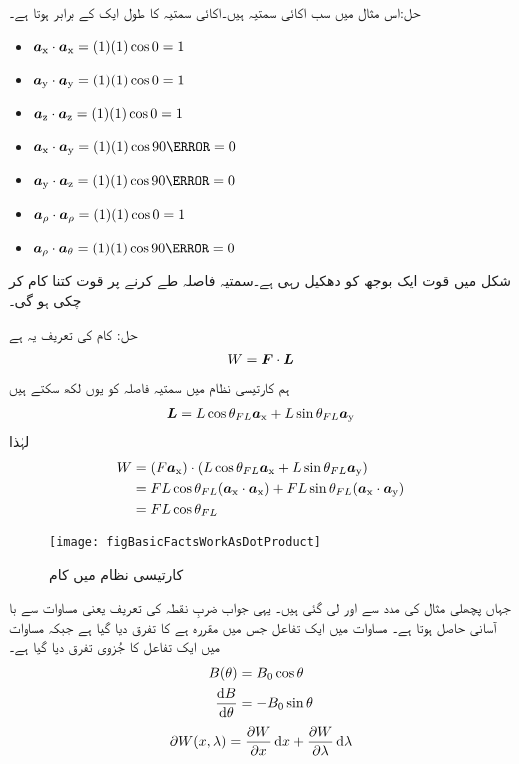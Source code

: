 حل:اس مثال میں سب اکائی سمتیہ ہیں۔اکائی سمتیہ کا طول ایک کے برابر ہوتا ہے۔
\begin{itemize}
\item
${\boldsymbol{a}}_{\textup{x}} \cdot {\boldsymbol{a}}_{\textup{x}} =(1) (1) \cos 0=1$\\
\item
${\boldsymbol{a}}_{\textup{y}} \cdot {\boldsymbol{a}}_{\textup{y}} =(1) (1) \cos 0=1$\\
\item
${\boldsymbol{a}}_{\textup{z}} \cdot {\boldsymbol{a}}_{\textup{z}} =(1) (1) \cos 0=1$\\
\item
$\ax \cdot \ay =(1) (1) \cos 90\degree=0$\\
\item
$\ay \cdot \az =(1) (1) \cos 90\degree=0$\\
\item
${\boldsymbol{a}}_{\rho} \cdot {\boldsymbol{a}}_{\rho} =(1) (1) \cos 0=1$\\
\item
$\arho \cdot \atheta =(1) (1) \cos 90\degree=0$\\
\end{itemize}
%
شکل   میں قوت  ایک بوجھ کو دھکیل رہی ہے۔سمتیہ فاصلہ   طے کرنے پر قوت کتنا کام کر چکی ہو گی۔

	حل:
	کام   کی تعریف یہ ہے
\begin{align}
W={{\boldsymbol{F}}} \cdot {\ensuremath{{\boldsymbol{L}}}}
\end{align}
ہم کارتیسی نظام میں سمتیہ فاصلہ کو یوں لکھ سکتے ہیں
\begin{align}
{\ensuremath{{\boldsymbol{L}}}}=L \cos \theta_{FL} {\boldsymbol{a}}_{\textup{x}} +L \sin \theta_{FL} {\boldsymbol{a}}_{\textup{y}}
\end{align}
لہٰذا
\begin{gather}
\begin{aligned}
W &= (F {\boldsymbol{a}}_{\textup{x}}) \cdot (L \cos \theta_{FL} {\boldsymbol{a}}_{\textup{x}} +L \sin \theta_{FL} {\boldsymbol{a}}_{\textup{y}})\\
&=F L \cos \theta_{FL} ({\boldsymbol{a}}_{\textup{x}} \cdot {\boldsymbol{a}}_{\textup{x}})+ F L \sin \theta_{FL} ({\boldsymbol{a}}_{\textup{x}} \cdot {\boldsymbol{a}}_{\textup{y}})\\
&= F L \cos \theta_{FL}
\end{aligned}
\end{gather}
%
\begin{figure}
\centering
\texttt{[image: figBasicFactsWorkAsDotProduct]}
\caption{کارتیسی نظام میں کام}
\label{شکل_حقائق_کارتیسی_کام}
\end{figure}
جہاں پچھلی مثال کی مدد سے  اور  لی گئی ہیں۔ یہی جواب ضربِ نقطہ کی تعریف یعنی مساوات سے با آسانی حاصل ہوتا ہے۔
%
مساوات میں ایک تفاعل جس میں مقررہ ہے کا تفرق دیا گیا ہے جبکہ مساوات  میں ایک تفاعل کا جُزوی تفرق  دیا گیا ہے۔
\begin{gather}
\begin{aligned}
B (\theta )&=B_0 \cos \theta\\
\frac{\dif B}{\dif \theta}&=-B_0 \sin \theta
\end{aligned}
\end{gather} 
%
\begin{align}
\partial W(x,\lambda)=\frac{\partial W}{\partial x} \dif x+\frac{\partial W}{\partial \lambda} \dif \lambda
\end{align}

